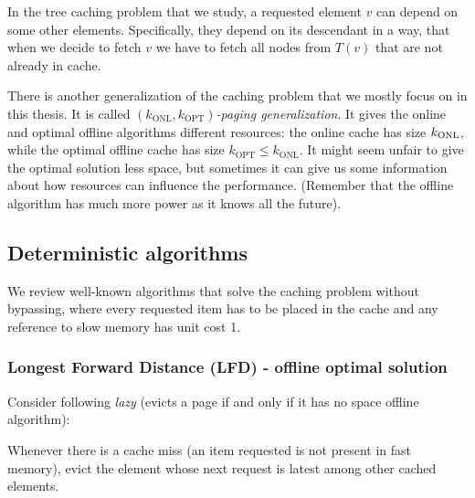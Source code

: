 In the tree caching problem that we study, a requested element $v$ can depend 
on some other elements. Specifically, they depend on its descendant in a 
way, that when we decide to fetch $v$ we have to fetch all nodes from $T(v)$ 
that are not already in cache.

There is another generalization of the caching problem that we mostly focus on in 
this thesis. It is called 
$(k_{\mathrm{ONL}}, k_{\mathrm{OPT}})$\textit{-paging generalization}. It gives 
the online and optimal offline algorithms different resources: the online cache has
size $k_{\mathrm{ONL}}$, while the optimal offline cache has size 
$k_{\mathrm{OPT}} \leq k_{\mathrm{ONL}}$. It might seem 
unfair to give the optimal solution less space, but sometimes it can give us 
some information about how resources can influence the performance. (Remember 
that the offline algorithm has much more power as it knows all the future).

\subsection{Deterministic algorithms}
We review well-known algorithms that solve the caching problem without bypassing, 
where every requested item has to be placed in the cache and any reference to 
slow memory has unit cost 1.
\subsubsection{Longest Forward Distance (LFD) - offline optimal solution}
Consider following \textit{lazy} (evicts a page if and only if it has no space  
offline algorithm): 
\begin{myalgo}
Whenever there is a cache miss (an item requested is not 
present in fast memory), evict the element whose next request is latest among other 
cached elements.
\end{myalgo}

